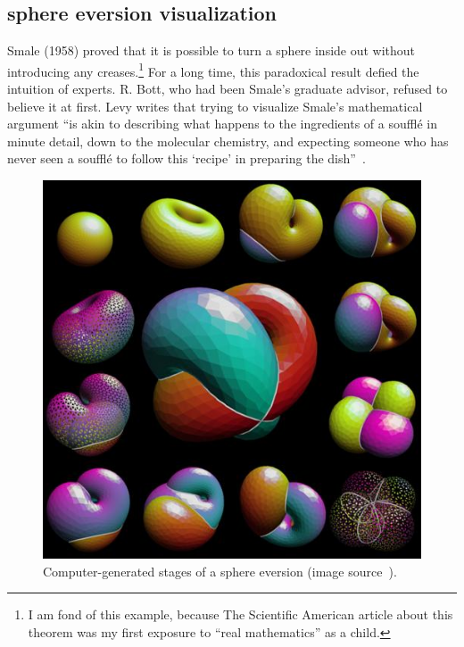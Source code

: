 \documentclass{llncs}
\begin{document}
\subsection{sphere eversion visualization}







Smale (1958) proved that it is possible to turn a sphere inside out
without introducing any creases.\footnote{I am fond of this example,
because The Scientific American
  article \cite{Phi66} about this theorem was my first exposure to ``real
  mathematics'' as a child.}  For a long time, this paradoxical result
defied the intuition of experts.  R. Bott, who had been Smale's
graduate advisor, refused to believe it at first.  Levy writes that
trying to visualize Smale's mathematical argument ``is akin to
describing what happens to the ingredients of a souffl\'e in minute
detail, down to the molecular chemistry, and expecting someone who has
never seen a souffl\'e to follow this `recipe' in preparing the
dish''~\cite{Le95}.

\begin{figure}[h!]
  \centering
\includegraphics[scale=0.5]{bivtile.jpeg}
\caption{Computer-generated stages of a sphere eversion (image
  source~\cite{opti}).}
\label{fig:eversion}
\end{figure}
\end{document}
